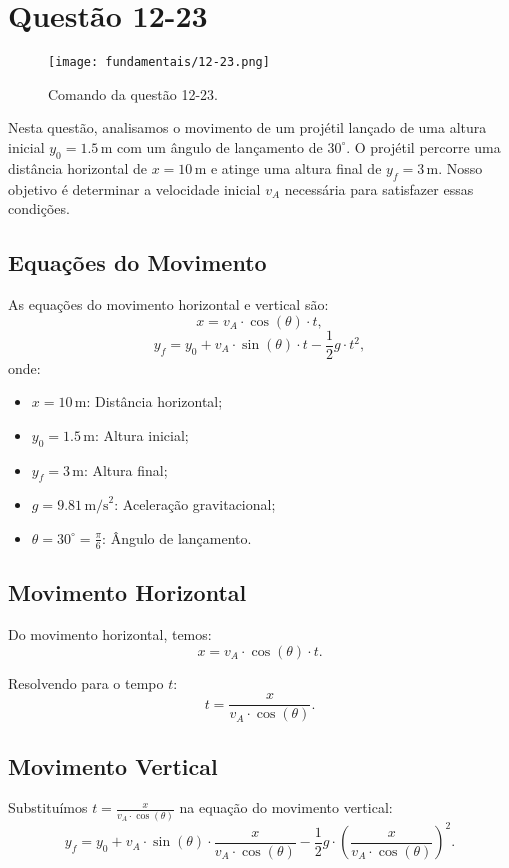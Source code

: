 \newpage
\section{Questão 12-23}

\begin{figure}[H]
	\centering
	\texttt{[image: fundamentais/12-23.png]}
	\caption{Comando da questão 12-23.}\label{fig:12-23}
\end{figure}

Nesta questão, analisamos o movimento de um projétil lançado de uma altura inicial \(y_0 = 1.5 \, \text{m}\) com um ângulo de lançamento de \(30^\circ\). O projétil percorre uma distância horizontal de \(x = 10 \, \text{m}\) e atinge uma altura final de \(y_f = 3 \, \text{m}\). Nosso objetivo é determinar a velocidade inicial \(v_A\) necessária para satisfazer essas condições.

\subsection*{Equações do Movimento}
As equações do movimento horizontal e vertical são:
\[
x = v_A \cdot \cos(\theta) \cdot t,
\]
\[
y_f = y_0 + v_A \cdot \sin(\theta) \cdot t - \frac{1}{2} g \cdot t^2,
\]
onde:
\begin{itemize}
    \item \(x = 10 \, \text{m}\): Distância horizontal;
    \item \(y_0 = 1.5 \, \text{m}\): Altura inicial;
    \item \(y_f = 3 \, \text{m}\): Altura final;
    \item \(g = 9.81 \, \text{m/s}^2\): Aceleração gravitacional;
    \item \(\theta = 30^\circ = \frac{\pi}{6}\): Ângulo de lançamento.
\end{itemize}

\subsection*{Movimento Horizontal}
Do movimento horizontal, temos:
\[
x = v_A \cdot \cos(\theta) \cdot t.
\]

Resolvendo para o tempo \(t\):
\[
t = \frac{x}{v_A \cdot \cos(\theta)}.
\]

\subsection*{Movimento Vertical}
Substituímos \(t = \frac{x}{v_A \cdot \cos(\theta)}\) na equação do movimento vertical:
\[
y_f = y_0 + v_A \cdot \sin(\theta) \cdot \frac{x}{v_A \cdot \cos(\theta)} - \frac{1}{2} g \cdot \left(\frac{x}{v_A \cdot \cos(\theta)}\right)^2.
\]

